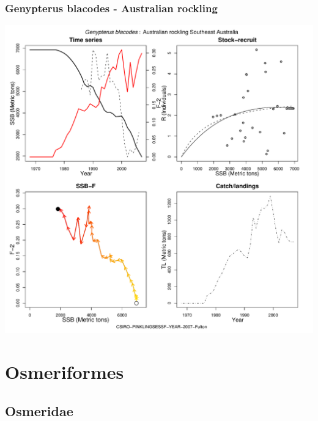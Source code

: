 \subsubsection{Genypterus blacodes - Australian rockling}
\begin{center}
\includegraphics[width=1.2\textwidth]{../R/figures/CSIRO-PINKLINGSESSF-YEAR-2007-Fulton.pdf}
\end{center}

\section{Osmeriformes}

\subsection{Osmeridae}

